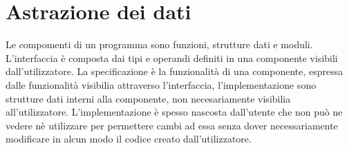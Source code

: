 \chapter{Astrazione dei dati}
Le compomenti di un programma sono funzioni, strutture dati e moduli. L'interfaccia \`e composta dai tipi e operandi definiti in una componente visibili dall'utilizzatore.
La specificazione \`e la funzionalit\`a di una componente, espressa dalle funzionalit\`a visibilia attraverso l'interfaccia, l'implementazione sono strutture dati interni
alla componente, non necesariamente visibilia all'utilizzatore. L'implementazione \`e spesso nascosta dall'utente che non pu\`o ne vedere n\`e utilizzare per permettere
cambi ad essa senza dover necessariamente modificare in alcun modo il codice creato dall'utilizzatore. 
